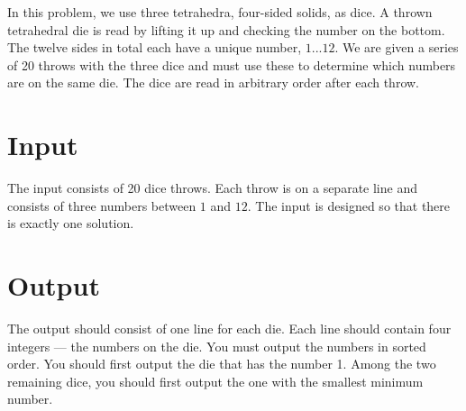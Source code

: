 
In this problem, we use three tetrahedra, four-sided solids, as dice. A thrown tetrahedral die is read by lifting it up and checking the number on the bottom. The twelve sides in total each have a unique number, $1...12$. We are given a series of 20 throws with the three dice and must use these to determine which numbers are on the same die. The dice are read in arbitrary order after each throw.

\section*{Input}
The input consists of 20 dice throws. Each throw is on a separate line and consists of three numbers between $1$ and $12$. The input is designed so that there is exactly one solution.

\section*{Output}
The output should consist of one line for each die. Each line should contain four integers --- the numbers on the die. You must output the numbers in sorted order. You should first output the die that has the number 1. Among the two remaining dice, you should first output the one with the smallest minimum number.
